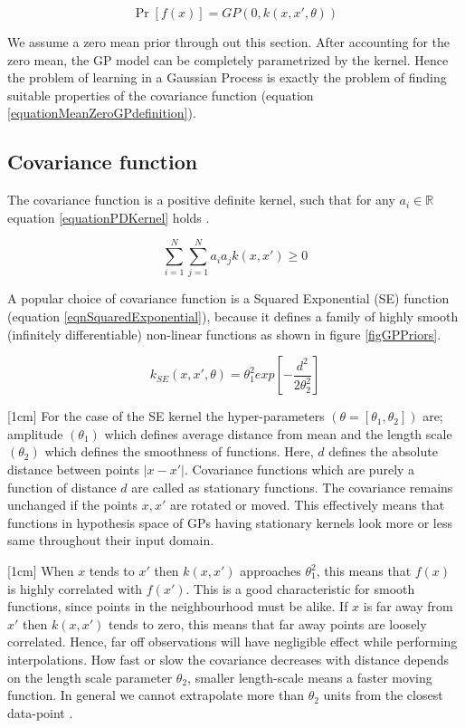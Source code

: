 \begin{equation}\label{equationMeanZeroGPdefinition}
\Pr[f(x)] = GP(0 , k(x, x', \theta))
\end{equation}

We assume a zero mean prior through out this section. After accounting for the zero mean, the GP model can be completely parametrized by the kernel. Hence the problem of learning in a Gaussian Process is exactly the problem of finding suitable properties of the covariance function \cite{rasmussen2006gaussian} (equation \ref{equationMeanZeroGPdefinition}). 


\subsection{Covariance function}\label{subSecCH2Covariance}
The covariance function is a positive definite kernel, such that for any \(a_{i} \in \mathbb{R}\) equation \ref{equationPDKernel} holds \cite{Stein1999Springer}.

\begin{equation}\label{equationPDKernel}
\sum_{i=1}^{N}\sum_{j=1}^{N}a_{i}a_{j}k(x,x') \geq 0
\end{equation}

A popular choice of covariance function is a Squared Exponential (SE) function (equation \ref{eqnSquaredExponential}), because it defines a family of highly smooth (infinitely differentiable) non-linear functions as shown in figure \ref{figGPPriors}.

\begin{equation}\label{eqnSquaredExponential}
k_{SE}(x, x', \theta) = \theta_{1}^2exp[-\frac{d^2}{2\theta_{2}^2}]
\end{equation}

[1cm]
For the case of the SE kernel the hyper-parameters \((\theta = [\theta_{1}, \theta_{2}])\) are; amplitude \((\theta_{1})\) which defines average distance from mean and the length scale \((\theta_{2})\) which defines the smoothness of functions. Here, \(d\) defines the absolute distance between points \(|x-x'|\). Covariance functions which are purely a function of distance \(d\) are called as stationary functions. The covariance remains unchanged if the points \(x, x'\) are rotated or moved. This effectively means that functions in hypothesis space of GPs having stationary kernels look more or less same throughout their input domain. 

[1cm]
When \(x\) tends to \(x'\) then \(k(x, x')\) approaches \(\theta_{1}^{2}\), this means that \(f(x)\) is highly correlated with \(f(x')\). This is a good characteristic for smooth functions, since points in the neighbourhood must be alike. If \(x\) is far away from  \(x'\) then \(k(x, x')\) tends to zero, this means that far away points are loosely correlated. Hence, far off observations will have negligible effect while performing interpolations. How fast or slow the covariance decreases with distance depends on the length scale parameter \(\theta_{2}\), smaller length-scale means a faster moving function. In general we cannot extrapolate more than \(\theta_{2}\) units from the closest data-point \cite{duvenaud-thesis-2014}. 

